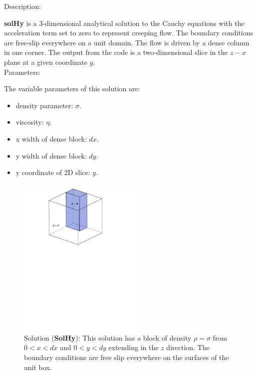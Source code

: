   {\large \fontB Description:}
  
  {\bf solHy} is a 3-dimensional analytical solution to the Cauchy equations with the acceleration term set to zero
  to represent creeping flow. The boundary conditions are free-slip everywhere on a unit domain. 
  The flow is driven by a dense column in one corner. The output from the code is a two-dimensional slice
  in the $z - x$ plane at a given coordinate $y$.
  \\

  {\large \fontB Parameters:}
 
  The variable parameters of this solution are:
  \begin{itemize}
    \item{density parameter: $ \sigma $.}
    \item{viscosity: $\eta$.}
    \item{x width of dense block: $dx$.}
    \item{y width of dense block: $dy$.}
    \item{y coordinate of 2D slice: $y$.}
    \end{itemize}

  \begin{figure}
    \includegraphics[width=6cm,clip]{../figs/figH.pdf}
    \caption[Short caption]{\label{figHy} 
      Solution ({\bf SolHy}):
      This solution has a block of density $\rho = \sigma$
       from $ 0 < x < dx $ and $ 0 < y < dy $ extending in the $z$ direction.
      The boundary conditions are free slip everywhere on the surfaces of the unit box.}
  \end{figure} 
  

